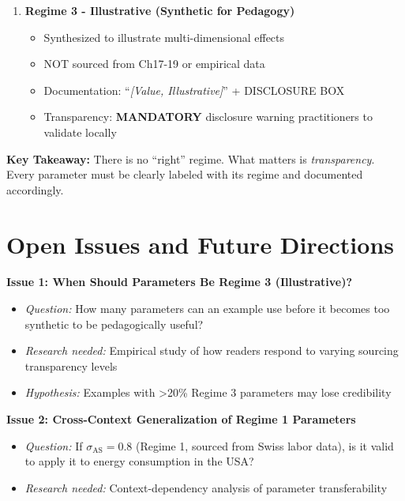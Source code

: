 \begin{table}[htbp]
\begin{tcolorbox}[colback=blue!5!white, colframe=blue!75!black, title=Summary Box]
\begin{enumerate}
\item \textbf{Regime 3 - Illustrative (Synthetic for Pedagogy)}
\begin{itemize}[nosep]
\item Synthesized to illustrate multi-dimensional effects
\item NOT sourced from Ch17-19 or empirical data
\item Documentation: ``\textit{[Value, Illustrative]}'' + DISCLOSURE BOX
\item Transparency: \textbf{MANDATORY} disclosure warning practitioners to validate locally
\end{itemize}
\end{enumerate}

\textbf{Key Takeaway:} There is no ``right'' regime. What matters is \textit{transparency}. Every parameter must be clearly labeled with its regime and documented accordingly.

\end{tcolorbox}


\section{Open Issues and Future Directions}
\label{sec:jjj-open}

\textbf{Issue 1: When Should Parameters Be Regime 3 (Illustrative)?}
\begin{itemize}[nosep]
\item \textit{Question:} How many parameters can an example use before it becomes too synthetic to be pedagogically useful?
\item \textit{Research needed:} Empirical study of how readers respond to varying sourcing transparency levels
\item \textit{Hypothesis:} Examples with >20\% Regime 3 parameters may lose credibility
\end{itemize}

\textbf{Issue 2: Cross-Context Generalization of Regime 1 Parameters}
\begin{itemize}[nosep]
\item \textit{Question:} If $\sigma_{\text{AS}} = 0.8$ (Regime 1, sourced from Swiss labor data), is it valid to apply it to energy consumption in the USA?
\item \textit{Research needed:} Context-dependency analysis of parameter transferability
\end{itemize}


\end{table}
